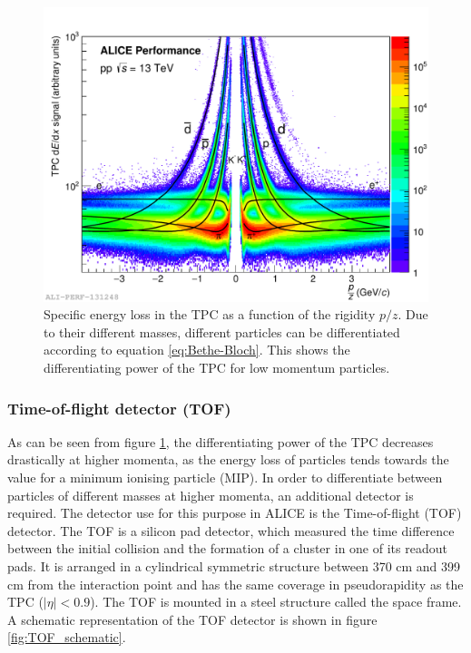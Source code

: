 \begin{figure}
    \centering
    \includegraphics[width=\textwidth]{figures/Ali_TPC_performance_pp.pdf}
    \caption{Specific energy loss in the TPC as a function of the rigidity $p/z$. Due to their different masses, different particles can be differentiated according to equation \ref{eq:Bethe-Bloch}. This shows the differentiating power of the TPC for low momentum particles.}
    \label{fig:PID_TPC}
\end{figure}

\subsubsection{Time-of-flight detector (TOF)}

As can be seen from figure \ref{fig:PID_TPC}, the differentiating power of the TPC decreases drastically at higher momenta, as the energy loss of particles tends towards the value for a minimum ionising particle (MIP). In order to differentiate between particles of different masses at higher momenta, an additional detector is required. The detector use for this purpose in ALICE is the Time-of-flight (TOF) detector. The TOF is a silicon pad detector, which measured the time difference between the initial collision and the formation of a cluster in one of its readout pads. It is arranged in a cylindrical symmetric structure between 370 cm and 399 cm from the interaction point and has the same coverage in pseudorapidity as the TPC ($|\eta| < 0.9$). The TOF is mounted in a steel structure called the space frame\cite{ALICE_TOF_TDR, ALICE_TDR}. A schematic representation of the TOF detector is shown in figure \ref{fig:TOF_schematic}. 

